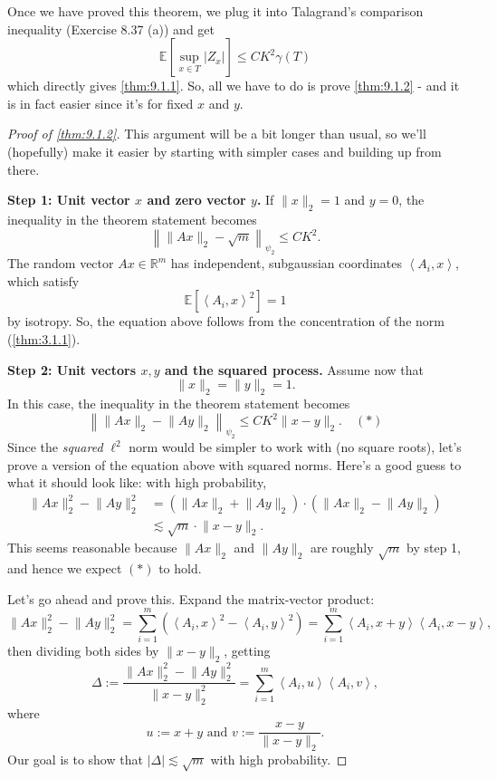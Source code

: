 Once we have proved this theorem, we plug it into Talagrand's comparison inequality (Exercise 8.37 (a)) and get 
\[ \mathbb{E}\left[ \sup_{x \in T} |Z_x| \right] \leq CK^2 \gamma(T) \]
which directly gives \cref{thm:9.1.1}. So, all we have to do is prove \cref{thm:9.1.2} - and it is in fact 
easier since it's for fixed $x$ and $y$.

\begin{proof}[Proof of \cref{thm:9.1.2}]
This argument will be a bit longer than usual, so we'll (hopefully) make it easier by starting with simpler 
cases and building up from there.

\textbf{Step 1: Unit vector $x$ and zero vector $y$.} If $\lVert x \rVert_{2} = 1$ and $y = 0$, the inequality 
in the theorem statement becomes 
\[ \left\lVert \lVert Ax \rVert_{2} - \sqrt{m} \right\rVert_{\psi_2} \leq CK^2. \]
The random vector $Ax \in \mathbb{R}^m$ has independent, subgaussian coordinates $\left\langle A_i, x
\right\rangle$, which satisfy 
\[ \mathbb{E}\left[ \left\langle A_i, x \right\rangle^2 \right] = 1 \] 
by isotropy. So, the equation above follows from the concentration of the norm (\cref{thm:3.1.1}).

\textbf{Step 2: Unit vectors $x, y$ and the squared process.} Assume now that 
\[ \lVert x \rVert_{2} = \lVert y \rVert_{2} = 1. \]
In this case, the inequality in the theorem statement becomes 
\[ \left\lVert \lVert Ax \rVert_{2} - \lVert Ay \rVert_{2} \right\rVert_{\psi_2} \leq 
CK^2 \lVert x - y \rVert_{2}. \quad (*) \]
Since the \textit{squared} $\ell^2$ norm would be simpler to work with (no square roots), let's prove a version 
of the equation above with squared norms. Here's a good guess to what it should look like: with high probability,
\begin{align*}
	\lVert Ax \rVert_{2}^2 - \lVert Ay \rVert_{2}^2 
	&= (\lVert Ax \rVert_{2} + \lVert Ay \rVert_{2}) \cdot (\lVert Ax \rVert_{2} - \lVert Ay \rVert_{2}) \\
	&\lesssim \sqrt{m} \cdot \lVert x - y \rVert_{2}.
\end{align*}
This seems reasonable because $\lVert Ax \rVert_{2}$ and $\lVert Ay \rVert_{2}$ are roughly $\sqrt{m}$ by step 
1, and hence we expect $(*)$ to hold.

Let's go ahead and prove this. Expand the matrix-vector product:
\[ \lVert Ax \rVert_{2}^2 - \lVert Ay \rVert_{2}^2 
= \sum_{i = 1}^{m} (\left\langle A_i, x \right\rangle^2 - \left\langle A_i, y \right\rangle^2) 
= \sum_{i = 1}^{m} \left\langle A_i, x + y \right\rangle \left\langle A_i, x - y \right\rangle, \]
then dividing both sides by $\lVert x - y \rVert_{2}$, getting 
\[ \Delta := \frac{\lVert Ax \rVert_{2}^2 - \lVert Ay \rVert_{2}^2}{\lVert x - y \rVert_{2}^2} 
= \sum_{i = 1}^{m} \left\langle A_i, u \right\rangle \left\langle A_i, v \right\rangle, \]
where 
\[ u := x + y \text{ and } v := \frac{x - y}{\lVert x - y \rVert_{2}}. \]
Our goal is to show that $|\Delta| \lesssim \sqrt{m}$ with high probability.


\end{proof}
